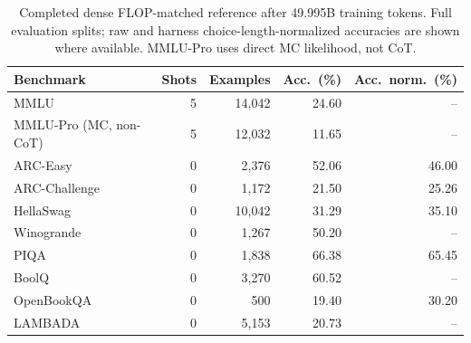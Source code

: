 \begin{table}[htbp]
\centering
\small
\begin{tabular}{lrrrr}
\toprule
Benchmark & Shots & Examples & Acc.\ (\%) & Acc.\ norm.\ (\%) \\
\midrule
MMLU & 5 & 14,042 & 24.60 & -- \\
MMLU-Pro (MC, non-CoT) & 5 & 12,032 & 11.65 & -- \\
ARC-Easy & 0 & 2,376 & 52.06 & 46.00 \\
ARC-Challenge & 0 & 1,172 & 21.50 & 25.26 \\
HellaSwag & 0 & 10,042 & 31.29 & 35.10 \\
Winogrande & 0 & 1,267 & 50.20 & -- \\
PIQA & 0 & 1,838 & 66.38 & 65.45 \\
BoolQ & 0 & 3,270 & 60.52 & -- \\
OpenBookQA & 0 & 500 & 19.40 & 30.20 \\
LAMBADA & 0 & 5,153 & 20.73 & -- \\
\bottomrule
\end{tabular}
\caption{Completed dense FLOP-matched reference after 49.995B training tokens.
Full evaluation splits; raw and harness choice-length-normalized accuracies
are shown where available. MMLU-Pro uses direct MC likelihood, not CoT.}
\label{tab:dense-flop-benchmarks}
\end{table}

